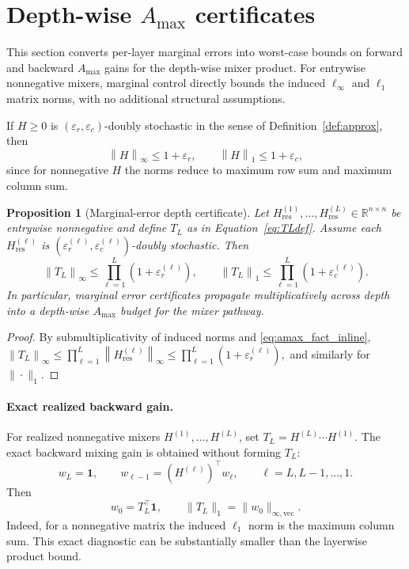 \documentclass[10pt]{article}
\numberwithin{equation}{section}
\theoremstyle{plain}
\newtheorem{proposition}[theorem]{Proposition}
\theoremstyle{definition}
\theoremstyle{remark}
\newcommand{\R}{\mathbb{R}}
\newcommand{\ones}{\mathbf{1}}
\newcommand{\norm}[1]{\left\lVert #1 \right\rVert}
\newcommand{\Hres}{H_{\mathrm{res}}}
\newcommand{\Amax}{\texorpdfstring{\ensuremath{A_{\max}}}{Amax}\xspace}
\begin{document}
\section{Depth-wise \Amax certificates}\label{sec:amax}

This section converts per-layer marginal errors into worst-case bounds on forward and backward \Amax gains for the depth-wise mixer product. For entrywise nonnegative mixers, marginal control directly bounds the induced $\ell_\infty$ and $\ell_1$ matrix norms, with no additional structural assumptions.

If $H\ge 0$ is $(\varepsilon_r,\varepsilon_c)$-doubly stochastic in the sense of Definition~\ref{def:approx}, then
\begin{equation}\label{eq:amax_fact_inline}
\norm{H}_\infty \le 1+\varepsilon_r,
\qquad
\norm{H}_1 \le 1+\varepsilon_c,
\end{equation}
since for nonnegative $H$ the norms reduce to maximum row sum and maximum column sum.

\begin{proposition}[Marginal-error depth certificate]\label{prop:product}
Let $\Hres^{(1)},\dots,\Hres^{(L)}\in\R^{n\times n}$ be entrywise nonnegative and define
$T_L$ as in Equation~\eqref{eq:TLdef}. Assume each $\Hres^{(\ell)}$ is
$(\varepsilon_r^{(\ell)},\varepsilon_c^{(\ell)})$-doubly stochastic. Then
\begin{equation}\label{eq:product}
\norm{T_L}_\infty\le \prod_{\ell=1}^L (1+\varepsilon_r^{(\ell)}),
\qquad
\norm{T_L}_1\le \prod_{\ell=1}^L (1+\varepsilon_c^{(\ell)}).
\end{equation}
In particular, marginal error certificates propagate multiplicatively across
depth into a depth-wise \Amax budget for the mixer pathway.
\end{proposition}

\begin{proof}
By submultiplicativity of induced norms and \eqref{eq:amax_fact_inline},
\(
\norm{T_L}_\infty
\le
\prod_{\ell=1}^L \norm{\Hres^{(\ell)}}_\infty
\le
\prod_{\ell=1}^L (1+\varepsilon_r^{(\ell)}),
\)
and similarly for $\|\cdot\|_1$.
\end{proof}

\paragraph{Exact realized backward gain.}
For realized nonnegative mixers $H^{(1)},\dots,H^{(L)}$, set
$T_L=H^{(L)}\cdots H^{(1)}$. The exact backward mixing gain is obtained without forming $T_L$:
\begin{equation}\label{eq:exact-backward-vector-prop}
        w_L=\ones,\qquad
        w_{\ell-1}=(H^{(\ell)})^\top w_\ell,
        \qquad \ell=L,L-1,\dots,1.
\end{equation}
Then
\begin{equation}\label{eq:exact-backward-gain}
        w_0=T_L^\top\ones,
        \qquad
        \|T_L\|_1=\|w_0\|_{\infty,\mathrm{vec}}.
\end{equation}
Indeed, for a nonnegative matrix the induced $\ell_1$ norm is the maximum column sum. This exact diagnostic can be substantially smaller than the layerwise product bound.
\end{document}
